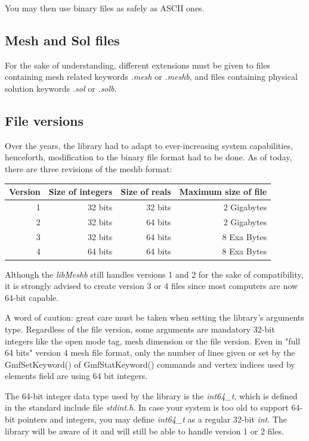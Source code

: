 \documentclass[a4paper,12pt]{article}
\begin{document}
You may then use binary files as safely as ASCII ones.

\subsection{Mesh and Sol files}
For the sake of understanding, different extensions must be given to files containing mesh related keywords \emph{.mesh} or \emph{.meshb}, and files containing physical solution keywords \emph{.sol} or \emph{.solb}.

\subsection{File versions}
Over the years, the library had to adapt to ever-increasing system capabilities, henceforth, modification to the binary file format had to be done. As of today, there are three revisions of the meshb format:
\medskip

\begin{tabular}{|r|r|r|r|}
\hline
Version & Size of integers & Size of reals & Maximum size of file \\
\hline
1 & 32 bits & 32 bits & 2 Gigabytes \\
\hline
2 & 32 bits & 64 bits & 2 Gigabytes \\
\hline
3 & 32 bits & 64 bits & 8 Exa Bytes \\
\hline
4 & 64 bits & 64 bits & 8 Exa Bytes \\
\hline
\end{tabular}
\medskip

Although the \emph{libMeshb} still handles versions 1 and 2 for the sake of compatibility, it is strongly advised to create version 3 or 4 files since most computers are now 64-bit capable.

A word of caution: great care must be taken when setting the library's arguments type. Regardless of the file version, some arguments are mandatory 32-bit integers like the open mode tag, mesh dimension or the file version. Even in "full 64 bits" version 4 mesh file format, only the number of lines given or set by the GmfSetKeyword() of GmfStatKeyword() commands and vertex indices used by elements field are using 64 bit integers.

The 64-bit integer data type used by the library is the \emph{int64\_t}, which is defined in the standard include file \emph{stdint.h}. In case your system is too old to support 64-bit pointers and integers, you may define \emph{int64\_t} as a regular 32-bit \emph{int}. The library will be aware of it and will still be able to handle version 1 or 2 files.
\end{document}
